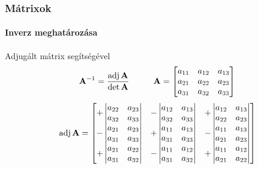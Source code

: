 \documentclass[xcolor={table}]{beamer}
\begin{document}
\begin{frame}
  \frametitle{Mátrixok}
  \framesubtitle{Inverz meghatározása}

  \begin{block}{Adjugált mátrix segítségével}
    \[
      \mathbf{A}^{-1} = \frac{\operatorname{adj} \mathbf{A}}{\det \mathbf{A}}
      \hspace{1cm}
      \mathbf{A} = \begin{bmatrix}
        a_{11} & a_{12} & a_{13} \\
        a_{21} & a_{22} & a_{23} \\
        a_{31} & a_{32} & a_{33}
      \end{bmatrix}
    \]
    \[
      \operatorname{adj} \mathbf{A} = \begin{bmatrix}
        + \begin{vmatrix}
            a_{22} & a_{23} \\
            a_{32} & a_{33}
          \end{vmatrix}
         &
        - \begin{vmatrix}
            a_{12} & a_{13} \\
            a_{32} & a_{33}
          \end{vmatrix}
         &
        +\begin{vmatrix}
           a_{12} & a_{13} \\
           a_{22} & a_{23}
         \end{vmatrix}
        \\
        - \begin{vmatrix}
            a_{21} & a_{23} \\
            a_{31} & a_{33}
          \end{vmatrix}
         &
        + \begin{vmatrix}
            a_{11} & a_{13} \\
            a_{31} & a_{33}
          \end{vmatrix}
         &
        - \begin{vmatrix}
            a_{11} & a_{13} \\
            a_{21} & a_{23}
          \end{vmatrix}
        \\
        + \begin{vmatrix}
            a_{21} & a_{22} \\
            a_{31} & a_{32}
          \end{vmatrix}
         &
        - \begin{vmatrix}
            a_{11} & a_{12} \\
            a_{31} & a_{32}
          \end{vmatrix}
         &
        +\begin{vmatrix}
           a_{11} & a_{12} \\
           a_{21} & a_{22}
         \end{vmatrix}
      \end{bmatrix}
    \]
  \end{block}
\end{frame}
\end{document}
